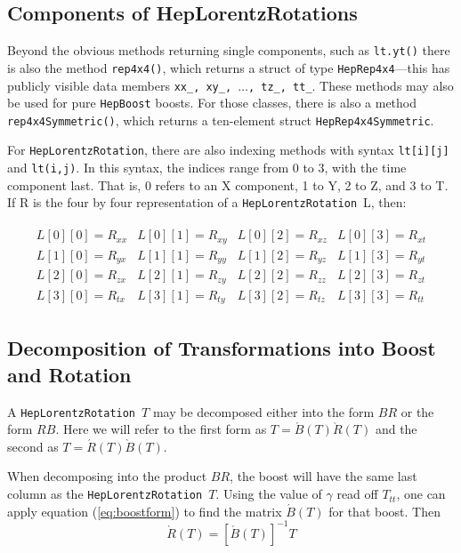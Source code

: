 \documentclass[twoside,12pt]{article}
\def \LT {{\tt HepLorentzRotation}}
\begin{document}
\subsection{Components of HepLorentzRotations}

Beyond the obvious methods returning single components, such as 
{\tt lt.yt()} there is also the method {\tt rep4x4()}, 
which returns a struct of type {\tt HepRep4x4}---this has publicly
visible data members {\tt xx\_, xy\_, $\ldots$, tz\_, tt\_}.  These
methods may also be used for pure {\tt HepBoost} boosts.  For those
classes, there is also a method {\tt rep4x4Symmetric()}, which returns
a ten-element struct {\tt HepRep4x4Symmetric}.

For \LT, there are also indexing methods with syntax
{\tt lt[i][j]} and {\tt lt(i,j)}.  
In this syntax, the indices range from 0 to 3, with the time component last.
That is, 0 refers to an X component, 1 to Y, 2 to Z, and 3 to T.
If R is the four by four representation of a \LT\ L, then:

\begin{eqnarray}
\label{eq:ltsubscript}
\begin{array}{llll}
  L [0] [0] = R_{xx} & L [0] [1] = R_{xy} &
  L [0] [2] = R_{xz} & L [0] [3] = R_{xt} \\
\nonumber
  L [1] [0] = R_{yx} & L [1] [1] = R_{yy} &
  L [1] [2] = R_{yz} & L [1] [3] = R_{yt} \\
\nonumber
  L [2] [0] = R_{zx} & L [2] [1] = R_{zy} &
  L [2] [2] = R_{zz} & L [2] [3] = R_{zt} \\
\nonumber
  L [3] [0] = R_{tx} & L [3] [1] = R_{ty} &
  L [3] [2] = R_{tz} & L [3] [3] = R_{tt} 
\end{array}
\end{eqnarray}

\subsection{Decomposition of Transformations into Boost and Rotation}

A \LT\ $T$ may be decomposed either into the form $ B R $ or the form
$ R B $.  Here we will refer to the 
first form as $T = \acute{B}(T) \grave{R}(T)$
and the second as $T = \acute{R}(T) \grave{B}(T)$.

When decomposing into the product $ B R $, the boost
will have the same last column as the \LT\ $T$.  Using the value of
$\gamma$ read off $T_{tt}$, one can apply equation (\ref{eq:boostform}) to
find the matrix $\acute{B}(T)$ for that boost.  Then
\begin{equation}
\label{eq:decomBR}
  \grave{R}(T) = \left[ \acute{B}(T) \right] ^{-1} T
\end{equation}
\end{document}
